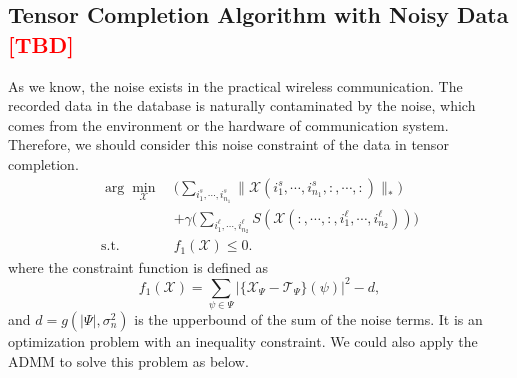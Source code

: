 \documentclass[12pt, draftcls, onecolumn]{IEEEtran}
\theoremstyle{plain}
\theoremstyle{definition}
\theoremstyle{remark}
\newcommand{\nt}[1]{\textcolor{red}{\textbf{[#1]}}}
\begin{document}
\vspace{10em}

\subsection{Tensor Completion Algorithm with Noisy Data \nt{TBD}}


As we know, the noise exists in the practical wireless communication. 
The recorded data in the database is naturally contaminated by the noise, which comes from the environment or the hardware of communication system.
Therefore, we should consider this noise constraint of the data in tensor completion.
\begin{equation}
\begin{aligned}
    \arg\min_{\mathcal{X}}\ & \bigg(\sum_{i^s_{1},\cdots,i^s_{n_1}}\lVert \mathcal{X}(i^s_{1},\cdots,i^s_{n_1},:,\cdots,:)\rVert_*\bigg)\\
    &+\gamma \bigg(\sum_{i^{\ell}_{1},\cdots,i^{\ell}_{n_2}}{S}\left(\mathcal{X}(:,\cdots,:,i^{\ell}_{1},\cdots,i^{\ell}_{n_2})\right)\bigg)\\
    \text{s.t. }
				& f_1(\mathcal{X}) \leq 0.
\end{aligned}
\end{equation}
where the constraint function is defined as $$f_1(\mathcal{X}) = \sum_{\psi\in\Psi} \Big\lvert\{\mathcal{X}_\Psi - \mathcal{T}_\Psi\}(\psi)\Big\rvert^2 - d,$$
and $d= g(\lvert\Psi\rvert,\sigma_n^2)$ is the upperbound of the sum of the noise terms.
It is an optimization problem with an inequality constraint.
We could also apply the ADMM to solve this problem as below.
\end{document}
